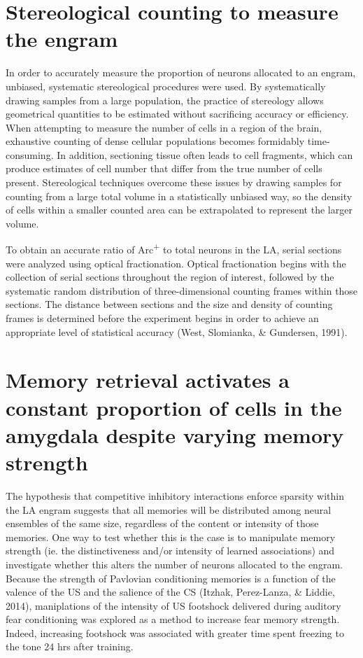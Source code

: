\documentclass[12pt,a4paperpaper,]{report}
\begin{document}
\section{Stereological counting to measure the
engram}\label{stereological-counting-to-measure-the-engram}

In order to accurately measure the proportion of neurons allocated to an
engram, unbiased, systematic stereological procedures were used. By
systematically drawing samples from a large population, the practice of
stereology allows geometrical quantities to be estimated without
sacrificing accuracy or efficiency. When attempting to measure the
number of cells in a region of the brain, exhaustive counting of dense
cellular populations becomes formidably time-consuming. In addition,
sectioning tissue often leads to cell fragments, which can produce
estimates of cell number that differ from the true number of cells
present. Stereological techniques overcome these issues by drawing
samples for counting from a large total volume in a statistically
unbiased way, so the density of cells within a smaller counted area can
be extrapolated to represent the larger volume.

To obtain an accurate ratio of Arc\textsuperscript{+} to total neurons
in the LA, serial sections were analyzed using optical fractionation.
Optical fractionation begins with the collection of serial sections
throughout the region of interest, followed by the systematic random
distribution of three-dimensional counting frames within those sections.
The distance between sections and the size and density of counting
frames is determined before the experiment begins in order to achieve an
appropriate level of statistical accuracy (West, Slomianka, \&
Gundersen, 1991).

\section{Memory retrieval activates a constant proportion of cells in
the amygdala despite varying memory
strength}\label{memory-retrieval-activates-a-constant-proportion-of-cells-in-the-amygdala-despite-varying-memory-strength-1}

The hypothesis that competitive inhibitory interactions enforce sparsity
within the LA engram suggests that all memories will be distributed
among neural ensembles of the same size, regardless of the content or
intensity of those memories. One way to test whether this is the case is
to manipulate memory strength (ie. the distinctiveness and/or intensity
of learned associations) and investigate whether this alters the number
of neurons allocated to the engram. Because the strength of Pavlovian
conditioning memories is a function of the valence of the US and the
salience of the CS (Itzhak, Perez-Lanza, \& Liddie, 2014), maniplations
of the intensity of US footshock delivered during auditory fear
conditioning was explored as a method to increase fear memory strength.
Indeed, increasing footshock was associated with greater time spent
freezing to the tone 24 hrs after training.
\end{document}
